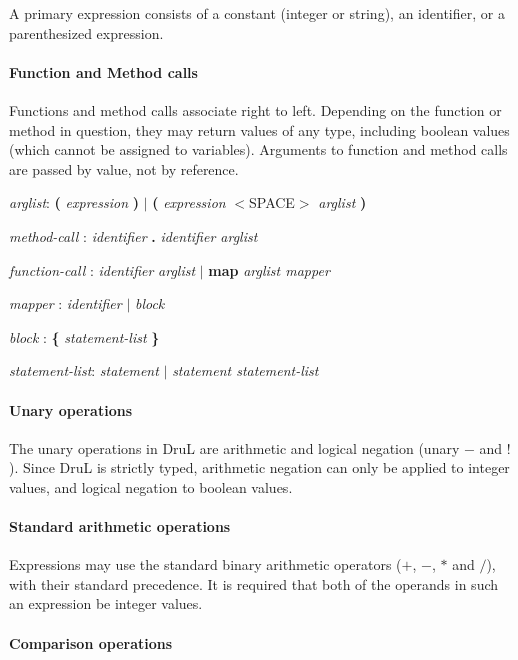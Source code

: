 \documentclass[11pt,twoside]{article}
\begin{document}
A primary expression consists of a constant (integer or string), an identifier, or a parenthesized expression.

\paragraph{Function and Method calls}
Functions and method calls associate right to left.  Depending on the function or method in question, they may return values of any type, including boolean values (which cannot be assigned to variables). Arguments to function and method
calls are passed by value, not by reference.

\emph{arglist}: \textbf ( \emph{expression} \textbf ) $|$  \textbf ( \emph{expression} 
$<$SPACE$>$ \emph{arglist} \textbf )

\emph{method-call} : \emph{identifier} \textbf . \emph{identifier arglist} 

\emph{function-call} : \emph{identifier} \emph{arglist} $|$ \textbf{map} \emph{arglist mapper}

\emph{mapper} : \emph{identifier} $|$ \emph{block}

\emph{block} : \textbf{\{} \emph{statement-list} \textbf{\}} 

\emph{statement-list}: \emph{statement} $|$ \emph{statement statement-list}



\paragraph{Unary operations}
The unary operations in DruL are arithmetic and logical negation (unary $-$ and $!$).  Since DruL is strictly typed, arithmetic negation can only be applied to integer values, and logical negation to boolean values.

\paragraph{Standard arithmetic operations}

Expressions may use the standard binary arithmetic operators ($+$, $-$, $*$ and $/$), with their standard precedence.  It is required that both of the operands in such an expression be integer values.

\paragraph{Comparison operations}
\end{document}
